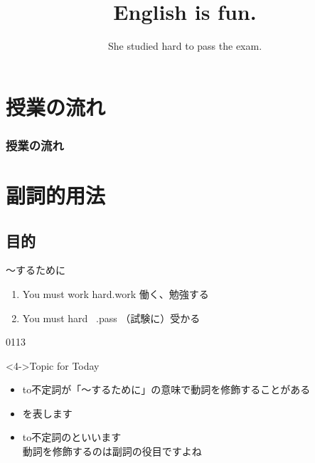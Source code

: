 \documentclass[aspectratio=169,xcolor={dvipsnames,table}]{beamer}
\title{English is fun.}
\subtitle{She studied hard to pass the exam.}
\author{}
\institute[]{}
\date[]
\begin{document}
\begin{frame}[plain]
  \titlepage
\end{frame}

\section*{授業の流れ}
\begin{frame}[plain]
  \frametitle{授業の流れ}
  \tableofcontents
\end{frame}

\section{副詞的用法}
\subsection{目的}
\begin{frame}[plain]{～するために}
 \large

\begin{enumerate}
 \item<1-> You must work hard.\hfill{\scriptsize work  働く、勉強する}
 \item<2-> You must hard \,\,\,.\hfill{\scriptsize pass  （試験に）受かる}

\end{enumerate}


%
\hfill{\tiny 0113}\,{\scriptsize {}}
%
\begin{block}<4->{Topic for Today}
\begin{itemize}[square]\small
 \item<4-> to不定詞が「〜するために」の意味で動詞を修飾することがある
 \item<5-> を表します
 \item<6-> to不定詞のといいます\\
       \hfill{\scriptsize 動詞を修飾するのは副詞の役目ですよね}
 \end{itemize}
     \end{block}

\end{frame}
\end{document}
